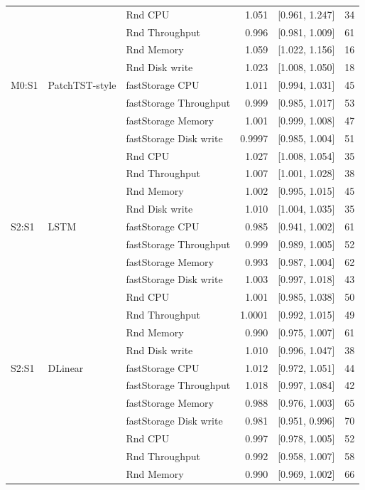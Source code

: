 \begin{longtable}{@{}lllrrr@{}}
 &  & Rnd CPU & 1.051 & [0.961, 1.247] & 34 \\
 &  & Rnd Throughput & 0.996 & [0.981, 1.009] & 61 \\
 &  & Rnd Memory & 1.059 & [1.022, 1.156] & 16 \\
 &  & Rnd Disk write & 1.023 & [1.008, 1.050] & 18 \\
\addlinespace
M0:S1 & PatchTST-style & fastStorage CPU & 1.011 & [0.994, 1.031] & 45 \\
 &  & fastStorage Throughput & 0.999 & [0.985, 1.017] & 53 \\
 &  & fastStorage Memory & 1.001 & [0.999, 1.008] & 47 \\
 &  & fastStorage Disk write & 0.9997 & [0.985, 1.004] & 51 \\
 &  & Rnd CPU & 1.027 & [1.008, 1.054] & 35 \\
 &  & Rnd Throughput & 1.007 & [1.001, 1.028] & 38 \\
 &  & Rnd Memory & 1.002 & [0.995, 1.015] & 45 \\
 &  & Rnd Disk write & 1.010 & [1.004, 1.035] & 35 \\
\addlinespace
S2:S1 & LSTM & fastStorage CPU & 0.985 & [0.941, 1.002] & 61 \\
 &  & fastStorage Throughput & 0.999 & [0.989, 1.005] & 52 \\
 &  & fastStorage Memory & 0.993 & [0.987, 1.004] & 62 \\
 &  & fastStorage Disk write & 1.003 & [0.997, 1.018] & 43 \\
 &  & Rnd CPU & 1.001 & [0.985, 1.038] & 50 \\
 &  & Rnd Throughput & 1.0001 & [0.992, 1.015] & 49 \\
 &  & Rnd Memory & 0.990 & [0.975, 1.007] & 61 \\
 &  & Rnd Disk write & 1.010 & [0.996, 1.047] & 38 \\
\addlinespace
S2:S1 & DLinear & fastStorage CPU & 1.012 & [0.972, 1.051] & 44 \\
 &  & fastStorage Throughput & 1.018 & [0.997, 1.084] & 42 \\
 &  & fastStorage Memory & 0.988 & [0.976, 1.003] & 65 \\
 &  & fastStorage Disk write & 0.981 & [0.951, 0.996] & 70 \\
 &  & Rnd CPU & 0.997 & [0.978, 1.005] & 52 \\
 &  & Rnd Throughput & 0.992 & [0.958, 1.007] & 58 \\
 &  & Rnd Memory & 0.990 & [0.969, 1.002] & 66 \\

\end{longtable}
